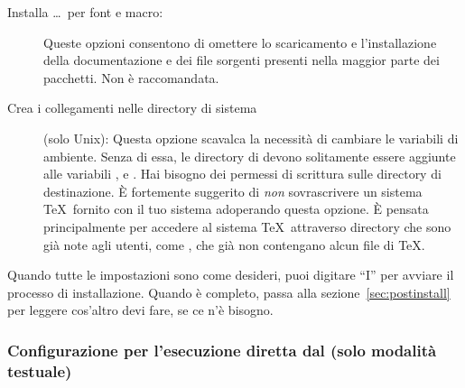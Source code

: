\documentclass{article}
\begin{document}
\begin{description}
\item[Installa \ldots\ per font e macro:] Queste opzioni consentono di
  omettere lo scaricamento e l'installazione della documentazione e dei
  file sorgenti presenti nella maggior parte dei pacchetti. Non è
  raccomandata.

\item[Crea i collegamenti nelle directory di sistema] (solo Unix): Questa
  opzione scavalca la necessità di cambiare le variabili di ambiente.
  Senza di essa, le directory di \TL{} devono solitamente essere aggiunte
  alle variabili ,  e .
  Hai bisogno dei permessi di scrittura sulle directory di destinazione. È
  fortemente suggerito di \emph{non} sovrascrivere un sistema \TeX\
  fornito con il tuo sistema adoperando questa opzione. È pensata
  principalmente per accedere al sistema \TeX\ attraverso directory che
  sono già note agli utenti, come \dirname{/usr/local/bin}, che già non
  contengano alcun file di \TeX.
\end{description}

Quando tutte le impostazioni sono come desideri, puoi digitare ``I'' per
avviare il processo di installazione. Quando è completo, passa alla
sezione~\ref{sec:postinstall} per leggere cos'altro devi fare, se ce n'è
bisogno.

\subsubsection{Configurazione per l'esecuzione diretta dal \DVD{} (solo
  modalità testuale)}
\label{sec:fromdvd}
\end{document}
